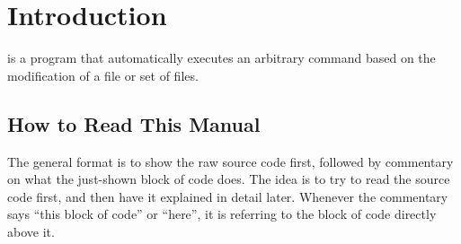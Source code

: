 \section{Introduction}

 is a program that automatically executes an arbitrary command based on the modification of a file or set of files.

\subsection{How to Read This Manual}

The general format is to show the raw source code first, followed by commentary on what the just-shown block of code does.
The idea is to try to read the source code first, and then have it explained in detail later.
Whenever the commentary says ``this block of code'' or ``here'', it is referring to the block of code directly above it.
